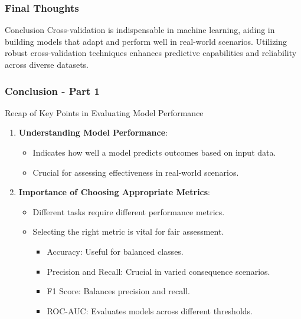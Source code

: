 \documentclass[aspectratio=169]{beamer}
\begin{document}
\begin{frame}[fragile]
    \frametitle{Final Thoughts}
    \begin{block}{Conclusion}
        Cross-validation is indispensable in machine learning, aiding in building models that adapt and perform well in real-world scenarios. 
        Utilizing robust cross-validation techniques enhances predictive capabilities and reliability across diverse datasets.
    \end{block}
\end{frame}

\begin{frame}[fragile]
    \frametitle{Conclusion - Part 1}
    \begin{block}{Recap of Key Points in Evaluating Model Performance}
        \begin{enumerate}
            \item \textbf{Understanding Model Performance}:
                \begin{itemize}
                    \item Indicates how well a model predicts outcomes based on input data.
                    \item Crucial for assessing effectiveness in real-world scenarios.
                \end{itemize}
            \item \textbf{Importance of Choosing Appropriate Metrics}:
                \begin{itemize}
                    \item Different tasks require different performance metrics.
                    \item Selecting the right metric is vital for fair assessment.
                    \begin{itemize}
                        \item Accuracy: Useful for balanced classes.
                        \item Precision and Recall: Crucial in varied consequence scenarios.
                        \item F1 Score: Balances precision and recall.
                        \item ROC-AUC: Evaluates models across different thresholds.
                    \end{itemize}
                \end{itemize}
        \end{enumerate}
    \end{block}
\end{frame}
\end{document}
